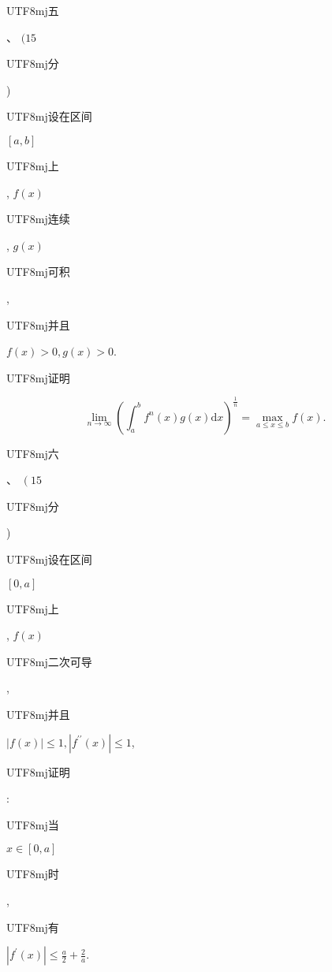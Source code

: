 \documentclass[10pt]{article}
\begin{document}
\begin{CJK}{UTF8}{mj}五\end{CJK}、 $(15$ \begin{CJK}{UTF8}{mj}分\end{CJK}) \begin{CJK}{UTF8}{mj}设在区间\end{CJK} $[a, b]$ \begin{CJK}{UTF8}{mj}上\end{CJK}, $f(x)$ \begin{CJK}{UTF8}{mj}连续\end{CJK}, $g(x)$ \begin{CJK}{UTF8}{mj}可积\end{CJK}, \begin{CJK}{UTF8}{mj}并且\end{CJK} $f(x)>0, g(x)>0$. \begin{CJK}{UTF8}{mj}证明\end{CJK}
$$
\lim _{n \rightarrow \infty}\left(\int_{a}^{b} f^{n}(x) g(x) \mathrm{d} x\right)^{\frac{1}{n}}=\max _{a \leq x \leq b} f(x) .
$$
\begin{CJK}{UTF8}{mj}六\end{CJK}、 $\left(15\right.$ \begin{CJK}{UTF8}{mj}分\end{CJK} ) \begin{CJK}{UTF8}{mj}设在区间\end{CJK} $[0, a]$ \begin{CJK}{UTF8}{mj}上\end{CJK}, $f(x)$ \begin{CJK}{UTF8}{mj}二次可导\end{CJK}, \begin{CJK}{UTF8}{mj}并且\end{CJK} $|f(x)| \leq 1,\left|f^{\prime \prime}(x)\right| \leq 1$, \begin{CJK}{UTF8}{mj}证明\end{CJK}: \begin{CJK}{UTF8}{mj}当\end{CJK} $x \in[0, a]$ \begin{CJK}{UTF8}{mj}时\end{CJK}, \begin{CJK}{UTF8}{mj}有\end{CJK} $\left|f^{\prime}(x)\right| \leq \frac{a}{2}+\frac{2}{a} .$
\end{document}
